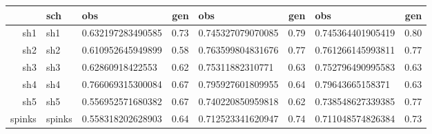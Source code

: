 \begin{table}[ht]
\centering
\begin{tabular}{rllrlrlr}
  \hline
 & sch & obs & gen & obs & gen & obs & gen \\ 
  \hline
sh1 & sh1 & 0.632197283490585 & 0.73 & 0.745327079070085 & 0.79 & 0.745364401905419 & 0.80 \\ 
  sh2 & sh2 & 0.610952645949899 & 0.58 & 0.763599804831676 & 0.77 & 0.761266145993811 & 0.77 \\ 
  sh3 & sh3 & 0.62860918422553 & 0.62 & 0.75311882310771 & 0.63 & 0.752796490995583 & 0.63 \\ 
  sh4 & sh4 & 0.766069315300084 & 0.67 & 0.795927601809955 & 0.64 & 0.79643665158371 & 0.63 \\ 
  sh5 & sh5 & 0.556952571680382 & 0.67 & 0.740220850959818 & 0.62 & 0.738548627339385 & 0.77 \\ 
  spinks & spinks & 0.558318202628903 & 0.64 & 0.712523341620947 & 0.74 & 0.711048574826384 & 0.73 \\ 
   \hline
\end{tabular}
\label{comp_tab}
\end{table}
